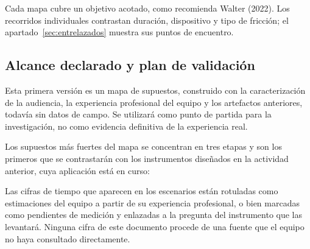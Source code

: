 Cada mapa cubre un objetivo acotado, como recomienda Walter (2022). Los recorridos
individuales contrastan duración, dispositivo y tipo de fricción; el
apartado~\ref{sec:entrelazados} muestra sus puntos de encuentro.

\subsection{Alcance declarado y plan de validación}\label{sec:alcance}

\begin{uxnota}
Esta primera versión es un mapa de supuestos, construido con la caracterización de la
audiencia, la experiencia profesional del equipo y los artefactos anteriores, todavía sin
datos de campo. Se utilizará como punto de partida para la investigación, no como evidencia
definitiva de la experiencia real.
\end{uxnota}

Los supuestos más fuertes del mapa se concentran en tres etapas y son los primeros que se
contrastarán con los instrumentos diseñados en la actividad anterior, cuya aplicación está en
curso:

\begin{uxlist}
\end{uxlist}

Las cifras de tiempo que aparecen en los escenarios están rotuladas como estimaciones del
equipo a partir de su experiencia profesional, o bien marcadas como pendientes de medición y
enlazadas a la pregunta del instrumento que las levantará. Ninguna cifra de este documento
procede de una fuente que el equipo no haya consultado directamente.

